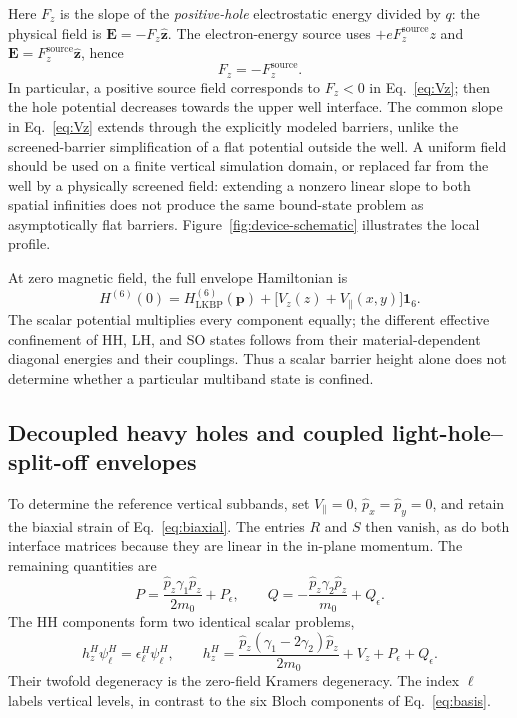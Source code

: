\documentclass[10pt,letterpaper]{article}
\newcommand{\ep}{\epsilon}
\newcommand{\one}{\mathbf 1}
\begin{document}
Here $F_z$ is the slope of the \emph{positive-hole} electrostatic energy divided by $q$: the physical field is $\bm E=-F_z\hat{\bm z}$. The electron-energy source uses $+eF_z^{\mathrm{source}}z$ and $\bm E=F_z^{\mathrm{source}}\hat{\bm z}$, hence
\begin{equation}
F_z=-F_z^{\mathrm{source}}.
\label{eq:fieldswitch}
\end{equation}
In particular, a positive source field corresponds to $F_z<0$ in Eq.~\eqref{eq:Vz}; then the hole potential decreases towards the upper well interface. The common slope in Eq.~\eqref{eq:Vz} extends through the explicitly modeled barriers, unlike the screened-barrier simplification of a flat potential outside the well. A uniform field should be used on a finite vertical simulation domain, or replaced far from the well by a physically screened field: extending a nonzero linear slope to both spatial infinities does not produce the same bound-state problem as asymptotically flat barriers. Figure~\ref{fig:device-schematic} illustrates the local profile.

At zero magnetic field, the full envelope Hamiltonian is
\begin{equation}
H^{(6)}(0)=H_{\mathrm{LKBP}}^{(6)}(\bm p)
+\bigl[V_z(z)+V_\parallel(x,y)\bigr]\one_6.
\label{eq:Htotalzero}
\end{equation}
The scalar potential multiplies every component equally; the different effective confinement of HH, LH, and SO states follows from their material-dependent diagonal energies and their couplings. Thus a scalar barrier height alone does not determine whether a particular multiband state is confined.

\subsection{Decoupled heavy holes and coupled light-hole--split-off envelopes}

To determine the reference vertical subbands, set $V_\parallel=0$, $ \hat{p}_ x= \hat{p}_ y=0$, and retain the biaxial strain of Eq.~\eqref{eq:biaxial}. The entries $R$ and $S$ then vanish, as do both interface matrices because they are linear in the in-plane momentum. The remaining quantities are
\begin{equation}
P=\frac{ \hat{p}_ z\gamma_1 \hat{p}_ z}{2m_0}+P_\ep,
\qquad
Q=-\frac{ \hat{p}_ z\gamma_2 \hat{p}_ z}{m_0}+Q_\ep.
\label{eq:PQvertical}
\end{equation}
The HH components form two identical scalar problems,
\begin{equation}
h_z^H\psi_\ell^H=\epsilon_\ell^H\psi_\ell^H,
\qquad
h_z^H=\frac{ \hat{p}_ z(\gamma_1-2\gamma_2) \hat{p}_ z}{2m_0}
+V_z+P_\ep+Q_\ep.
\label{eq:HHvertical}
\end{equation}
Their twofold degeneracy is the zero-field Kramers degeneracy. The index $\ell$ labels vertical levels, in contrast to the six Bloch components of Eq.~\eqref{eq:basis}.
\end{document}
